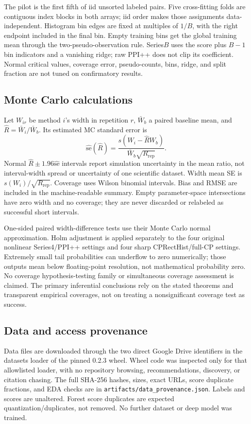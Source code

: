 \documentclass{article}
\begin{document}
The pilot is the first fifth of iid unsorted labeled pairs. Five cross-fitting folds are contiguous index blocks in both arrays; iid order makes those assignments data-independent. Histogram bin edges are fixed at multiples of $1/B$, with the right endpoint included in the final bin. Empty training bins get the global training mean through the two-pseudo-observation rule. Series$B$ uses the score plus $B-1$ bin indicators and a vanishing ridge; raw PPI++ does not clip its coefficient. Normal critical values, coverage error, pseudo-counts, bins, ridge, and split fraction are not tuned on confirmatory results.

\subsection{Monte Carlo calculations}
Let $W_{ir}$ be method $i$'s width in repetition $r$, $\bar W_b$ a paired baseline mean, and $\widehat R=\bar W_i/\bar W_b$. Its estimated MC standard error is
\[
 \widehat{\mathrm{se}}(\widehat R)=\frac{s(W_i-\widehat R W_b)}{\bar W_b\sqrt{R_{\mathrm{rep}}}}.
\]
Normal $\widehat R\pm1.96\widehat{\mathrm{se}}$ intervals report simulation uncertainty in the mean ratio, not interval-width spread or uncertainty of one scientific dataset. Width mean SE is $s(W_i)/\sqrt{R_{\mathrm{rep}}}$. Coverage uses Wilson binomial intervals. Bias and RMSE are included in the machine-readable summary. Empty parameter-space intersections have zero width and no coverage; they are never discarded or relabeled as successful short intervals.

One-sided paired width-difference tests use their Monte Carlo normal approximation. Holm adjustment is applied separately to the four original nonlinear Series4/PPI++ settings and four sharp CPRectHist/full-CP settings. Extremely small tail probabilities can underflow to zero numerically; those outputs mean below floating-point resolution, not mathematical probability zero. No coverage hypothesis-testing family or simultaneous coverage assessment is claimed. The primary inferential conclusions rely on the stated theorems and transparent empirical coverages, not on treating a nonsignificant coverage test as success.

\subsection{Data and access provenance}
Data files are downloaded through the two direct Google Drive identifiers in the datasets loader of the pinned 0.2.3 wheel. Wheel code was inspected only for that allowlisted loader, with no repository browsing, recommendations, discovery, or citation chasing. The full SHA-256 hashes, sizes, exact URLs, score duplicate fractions, and EDA checks are in \texttt{artifacts/data\_provenance.json}. Labels and scores are unaltered. Forest score duplicates are expected quantization/duplicates, not removed. No further dataset or deep model was trained.
\end{document}
